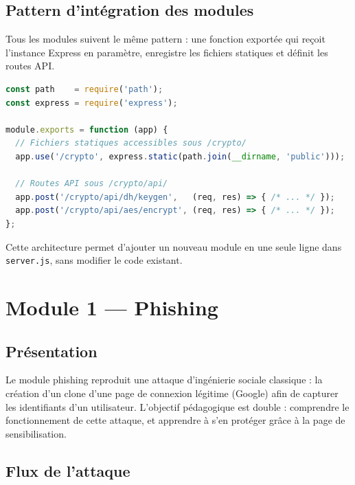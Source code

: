 \documentclass[12pt,a4paper]{report}
\newcommand{\code}[1]{\texttt{#1}}
\begin{document}
\section{Pattern d'intégration des modules}

Tous les modules suivent le même pattern : une fonction exportée qui
reçoit l'instance Express en paramètre, enregistre les fichiers statiques
et définit les routes API.

\begin{lstlisting}[language=JavaScript, caption={Pattern uniforme de chaque module (exemple : crypto)}]
const path    = require('path');
const express = require('express');

module.exports = function (app) {
  // Fichiers statiques accessibles sous /crypto/
  app.use('/crypto', express.static(path.join(__dirname, 'public')));

  // Routes API sous /crypto/api/
  app.post('/crypto/api/dh/keygen',   (req, res) => { /* ... */ });
  app.post('/crypto/api/aes/encrypt', (req, res) => { /* ... */ });
};
\end{lstlisting}

Cette architecture permet d'ajouter un nouveau module en une seule ligne
dans \code{server.js}, sans modifier le code existant.

\chapter{Module 1 — Phishing}

\section{Présentation}

Le module phishing reproduit une attaque d'ingénierie sociale classique :
la création d'un clone d'une page de connexion légitime (Google) afin de
capturer les identifiants d'un utilisateur. L'objectif pédagogique est
double : comprendre le fonctionnement de cette attaque, et apprendre à
s'en protéger grâce à la page de sensibilisation.

\section{Flux de l'attaque}
\end{document}
